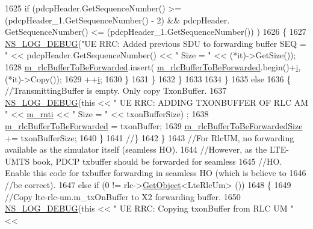 \begin{DoxyCode}
1625             \textcolor{keywordflow}{if} (pdcpHeader.GetSequenceNumber() >= (pdcpHeader\_1.GetSequenceNumber() - 2) && pdcpHeader.
      GetSequenceNumber() <= (pdcpHeader\_1.GetSequenceNumber()) )
1626             \{
1627               \hyperlink{group__logging_ga413f1886406d49f59a6a0a89b77b4d0a}{NS\_LOG\_DEBUG}(\textcolor{stringliteral}{"UE RRC: Added previous SDU to forwarding buffer SEQ = "} << 
      pdcpHeader.GetSequenceNumber() << \textcolor{stringliteral}{" Size = "} << (*it)->GetSize());
1628               \hyperlink{classns3_1_1LteUeRrc_acf565bc650023495082a94923956fb1a}{m\_rlcBufferToBeForwarded}.insert(
      \hyperlink{classns3_1_1LteUeRrc_acf565bc650023495082a94923956fb1a}{m\_rlcBufferToBeForwarded}.begin()+\hyperlink{bernuolliDistribution_8m_a6f6ccfcf58b31cb6412107d9d5281426}{i}, (*it)->Copy());
1629               ++\hyperlink{bernuolliDistribution_8m_a6f6ccfcf58b31cb6412107d9d5281426}{i};
1630             \}
1631           \}
1632         \}
1633         
1634       \}
1635       \textcolor{keywordflow}{else} 
1636       \{ \textcolor{comment}{//TransmittingBuffer is empty. Only copy TxonBuffer.}
1637         \hyperlink{group__logging_ga413f1886406d49f59a6a0a89b77b4d0a}{NS\_LOG\_DEBUG}(\textcolor{keyword}{this} << \textcolor{stringliteral}{" UE RRC: ADDING TXONBUFFER OF RLC AM "} << 
      \hyperlink{classns3_1_1LteUeRrc_a8e078d8ef0ad23e670fe2ef08caab84f}{m\_rnti} << \textcolor{stringliteral}{" Size = "} << txonBufferSize) ;
1638         \hyperlink{classns3_1_1LteUeRrc_acf565bc650023495082a94923956fb1a}{m\_rlcBufferToBeForwarded} = txonBuffer;
1639         \hyperlink{classns3_1_1LteUeRrc_afb37a53dac05a0ae624acab488e33d6f}{m\_rlcBufferToBeForwardedSize} += txonBufferSize;
1640       \}
1641     \textcolor{comment}{//\}}
1642   \}
1643   \textcolor{comment}{//For RlcUM, no forwarding available as the simulator itself (seamless HO).}
1644   \textcolor{comment}{//However, as the LTE-UMTS book, PDCP txbuffer should be forwarded for seamless }
1645   \textcolor{comment}{//HO. Enable this code for txbuffer forwarding in seamless HO (which is believe to }
1646   \textcolor{comment}{//be correct).}
1647   \textcolor{keywordflow}{else} \textcolor{keywordflow}{if} (0 != rlc->\hyperlink{classns3_1_1Object_a13e18c00017096c8381eb651d5bd0783}{GetObject}<LteRlcUm> ())
1648   \{
1649     \textcolor{comment}{//Copy lte-rlc-um.m\_txOnBuffer to X2 forwarding buffer.}
1650     \hyperlink{group__logging_ga413f1886406d49f59a6a0a89b77b4d0a}{NS\_LOG\_DEBUG}(\textcolor{keyword}{this} << \textcolor{stringliteral}{" UE RRC: Copying txonBuffer from RLC UM "} << 

\end{DoxyCode}
